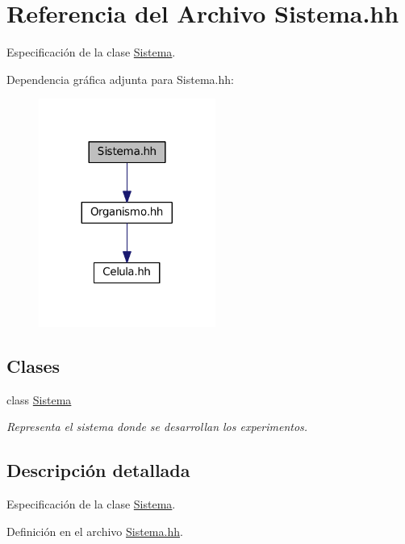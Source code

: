 \hypertarget{_sistema_8hh}{\section{Referencia del Archivo Sistema.\+hh}
\label{_sistema_8hh}
}


Especificación de la clase \hyperlink{class_sistema}{Sistema}.  


Dependencia gráfica adjunta para Sistema.\+hh\+:\nopagebreak
\begin{figure}[H]
\begin{center}
\leavevmode
\includegraphics[width=164pt]{_sistema_8hh__incl}
\end{center}
\end{figure}
\subsection*{Clases}
\begin{DoxyCompactItemize}
\item 
class \hyperlink{class_sistema}{Sistema}
\begin{DoxyCompactList}\small\item\em Representa el sistema donde se desarrollan los experimentos. \end{DoxyCompactList}\end{DoxyCompactItemize}


\subsection{Descripción detallada}
Especificación de la clase \hyperlink{class_sistema}{Sistema}. 



Definición en el archivo \hyperlink{_sistema_8hh_source}{Sistema.\+hh}.

